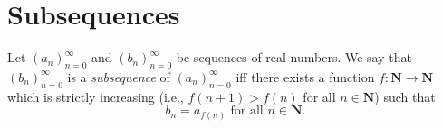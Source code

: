 \section{Subsequences}\label{sec 6.6}

\begin{definition}[Subsequences]\label{6.6.1}
Let \((a_n)_{n = 0}^\infty\) and \((b_n)_{n = 0}^\infty\) be sequences of real numbers.
We say that \((b_n)_{n = 0}^\infty\) is a \emph{subsequence} of \((a_n)_{n = 0}^\infty\) iff there exists a function \(f : \mathbf{N} \to \mathbf{N}\) which is strictly increasing (i.e., \(f(n + 1) > f(n)\) for all \(n \in \mathbf{N}\)) such that
\[
    b_n = a_{f(n)} \text{ for all } n \in \mathbf{N}.
\]
\end{definition}